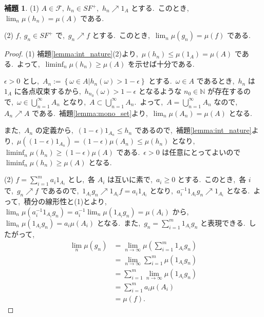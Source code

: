 \documentclass[a4j,11pt]{jarticle}
\theoremstyle{definition}
\newtheorem{lemma}[theorem]{補題}
\begin{document}
\begin{lemma}\label{lemma:point_convergence}
  (1)
  $A \in \mathcal{F},\ h_n \in SF^+$,\ 
  $h_n \nearrow 1_A$
  とする.\ 
  このとき,\ 
  $\lim_n \mu(h_n) = \mu(A)$
  である.\ 

  (2)
  $f,\ g_n \in SF^+$
  で,\ 
  $g_n \nearrow f$
  とする.\ 
  このとき,\ 
  $\lim_n \mu(g_n) = \mu(f)$
  である.\ 
\end{lemma}

\begin{proof}
  (1)
  補題\ref{lemma:int_nature}(2)より,\ 
  $\mu(h_n) \leq \mu(1_A) = \mu(A)$
  である.\ 
  よって,\ 
  $\liminf_{n} \mu(h_n) \geq \mu(A)$
  を示せば十分である.\ 

  $\epsilon > 0$
  とし,\ 
  $A_n := \left\{\omega \in A | h_n(\omega) > 1-\epsilon \right\}$
  とする.\ 
  $\omega \in A$
  であるとき,\ 
  $h_n$
  は
  $1_{A}$
  に各点収束するから,\ 
  $h_{n_0}(\omega) > 1 - \epsilon$
  となるような
  $n_0 \in \mathbb{N}$
  が存在するので,\ 
  $\omega \in \bigcup_{n=1}^{\infty} A_n$
  となり,\ 
  $A \subset \bigcup_{n=1}^{\infty} A_n$.\ 
  よって,\ 
  $A = \bigcup_{n=1}^{\infty} A_n$
  なので,\ 
  $A_n \nearrow A$
  である.\ 
  補題\ref{lemma:mono_set}より,\ 
  $\lim_n \mu(A_n) = \mu(A)$
  となる.\ 

  また,\ 
  $A_n$
  の定義から,\ 
  $(1-\epsilon)1_{A_n} \leq h_n$
  であるので,\ 補題\ref{lemma:int_nature}より,\ 
  $\mu((1-\epsilon)1_{A_n}) = (1-\epsilon)\mu(A_n) \leq \mu(h_n)$
  となり,\ 
  $\liminf_n \mu(h_n) \geq (1-\epsilon) \mu(A)$
  である.\ 
  $\epsilon>0$
  は任意にとってよいので
  $\liminf_n \mu(h_n) \geq \mu(A)$
  となる.\ 

  (2)
  $f = \sum_{i=1}^m a_i 1_{A_i}$
  とし,\ 
  各
  $A_i$
  は互いに素で,\ 
  $a_i \geq 0$
  とする.\ 
  このとき,\ 各
  $i$
  で,\ 
  $g_n \nearrow f$
  であるので,\ 
  $1_{A_i}g_n \nearrow 1_{A_i}f = a_i 1_{A_i}$
  となり,\ 
  $a_i^{-1}1_{A_i}g_n \nearrow 1_{A_i}$
  となる.\ 
  よって,\ 積分の線形性と(1)とより,\ 
  $\lim_n \mu(a_i^{-1}1_{A_i}g_n) = a_i^{-1} \lim_n \mu(1_{A_i}g_n) = \mu(A_i)$
  から,\ 
  $\lim_n \mu(1_{A_i}g_n) = a_i \mu(A_i)$
  となる.\ 
  また,\ 
  $g_n = \sum_{i=1}^m 1_{A_i}g_n$
  と表現できる.\ 
  したがって,\ 
  \begin{align}
    \lim_n \mu(g_n)
    & = \lim_{n \to \infty} \mu\left(\sum_{i=1}^m 1_{A_i}g_n \right) \\
    & = \lim_{n \to \infty} \sum_{i=1}^m \mu(1_{A_i}g_n) \\
    & = \sum_{i=1}^m \lim_{n \to \infty} \mu(1_{A_i}g_n) \\
    & = \sum_{i=1}^m a_i \mu(A_i) \\
    & = \mu(f).
  \end{align}
\end{proof}
\end{document}
